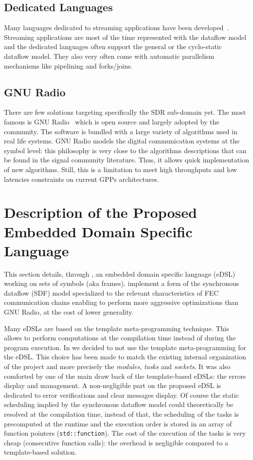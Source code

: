 \subsection{Dedicated Languages}

Many languages dedicated to streaming applications have been
developed~\cite{Buck2004,Amarasinghe2005,Liao2006,Black-Schaffer2010,Glitia2010,
Thies2010,DeOliveiraCastro2017}. Streaming applications are most of the time
represented with the dataflow model and the dedicated languages often support
the general or the cyclo-static dataflow model. They also very often come with
automatic parallelism mechanisms like pipelining and forks/joins.

\subsection{GNU Radio}

There are few solutions targeting specifically the SDR sub-domain yet. The most
famous is GNU Radio~\cite{GNURadio} which is open source and largely adopted by
the community. The software is bundled with a large variety of algorithms used
in real life systems. GNU Radio models the digital communication systems at the
symbol level: this philosophy is very close to the algorithms descriptions that
can be found in the signal community literature. Thus, it allows quick
implementation of new algorithms. Still, this is a limitation to meet high
throughputs and low latencies constraints on current GPPs architectures.

\section{Description of the Proposed Embedded Domain Specific Language}

This section details, through \AFFECT, an embedded domain specific language
(eDSL) working on sets of symbols (aka frames). \AFFECT implement a form of the
synchronous dataflow (SDF) model specialized to the relevant characteristics of
FEC communication chains enabling to perform more aggressive optimizations than
GNU Radio, at the cost of lower generality.

Many \Cxx eDSLs are based on the template meta-programming technique. This
allows to perform computations at the compilation time instead of during the
program execution. In \AFFECT we decided to not use the \Cxx template
meta-programming for the eDSL. This choice has been made to match the existing
internal organization of the project and more precisely the \emph{modules},
\emph{tasks} and \emph{sockets}. It was also comforted by one of the main draw
back of the template-based eDSLs: the errors display and management. A
non-negligible part on the proposed eDSL is dedicated to error verifications and
clear messages display. Of course the static scheduling implied by the
synchronous dataflow model could theoretically be resolved at the compilation
time, instead of that, the scheduling of the tasks is precomputed at the
runtime and the execution order is stored in an array of function pointers
(\verb|std::function|). The cost of the execution of the tasks is very cheap
(consecutive function calls): the overhead is negligible compared to a
template-based solution.


